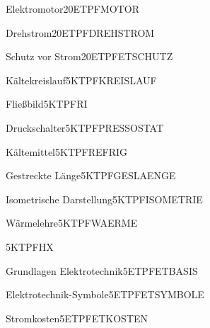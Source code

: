\documentclass[bsz-mkk-exam,ka]{teacher}
\begin{document}
\begin{examaufgabe}{Elektromotor}{20}{ET}{PF}{MOTOR}
\end{examaufgabe}

\begin{examaufgabe}{Drehstrom}{20}{ET}{PF}{DREHSTROM}
\end{examaufgabe}

\begin{examaufgabe}{Schutz vor Strom}{20}{ET}{PF}{ETSCHUTZ}
\end{examaufgabe}

\begin{examaufgabe}{Kältekreislauf}{5}{KT}{PF}{KREISLAUF}
\end{examaufgabe}

\begin{examaufgabe}{Fließbild}{5}{KT}{PF}{RI}
\end{examaufgabe}

\begin{examaufgabe}{Druckschalter}{5}{KT}{PF}{PRESSOSTAT}
\end{examaufgabe}

\begin{examaufgabe}{Kältemittel}{5}{KT}{PF}{REFRIG}
\end{examaufgabe}

\begin{examaufgabe}{Gestreckte Länge}{5}{KT}{PF}{GESLAENGE}
\end{examaufgabe}

\begin{examaufgabe}{Isometrische Darstellung}{5}{KT}{PF}{ISOMETRIE}
\end{examaufgabe}

\begin{examaufgabe}{Wärmelehre}{5}{KT}{PF}{WAERME}
\end{examaufgabe}

\begin{examaufgabe}{\hxdia}{5}{KT}{PF}{HX}
\end{examaufgabe}

\begin{examaufgabe}{Grundlagen Elektrotechnik}{5}{ET}{PF}{ETBASIS}
\end{examaufgabe}

\begin{examaufgabe}{Elektrotechnik-Symbole}{5}{ET}{PF}{ETSYMBOLE}
\end{examaufgabe}

\begin{examaufgabe}{Stromkosten}{5}{ET}{PF}{ETKOSTEN}
\end{examaufgabe}
\end{document}
